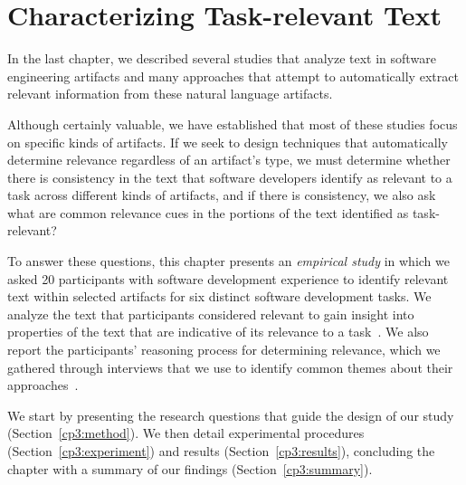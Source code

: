 \setcounter{chapter}{2}


\chapter{Characterizing Task-relevant Text}
\label{ch:characterizing}



In the last chapter,
we described several studies that analyze text in software engineering artifacts
and many approaches that attempt to automatically extract relevant information from
these natural language artifacts.


Although certainly valuable,
we have established that
most of these studies focus on specific kinds of artifacts.
If we seek to design
techniques that automatically determine relevance regardless of an artifact's type,
we must determine
whether
there is consistency in the text
that software developers identify as relevant to a task across
different kinds of artifacts, and if there is consistency, we also ask
what are common relevance cues in the portions of
the text identified as task-relevant?





To answer these questions, 
this chapter presents an
\textit{empirical study} in which we asked 20 participants with
software development experience to identify relevant text within
selected artifacts for six distinct software development tasks.
We analyze the text that participants considered relevant 
to gain insight into properties of the text 
that are indicative of its relevance to a task~\cite{das2014frame, jurafsky2014speech}. 
We also report the participants'
reasoning process for determining relevance,
which we gathered through interviews
that we use to identify
common themes about their approaches~\cite{spencer2009sorting}.



We start by presenting the research questions that guide 
the design of our study (Section~\ref{cp3:method}).
We then detail experimental procedures (Section~\ref{cp3:experiment}) 
and results (Section~\ref{cp3:results}),
concluding the chapter with a summary of our findings (Section~\ref{cp3:summary}).












